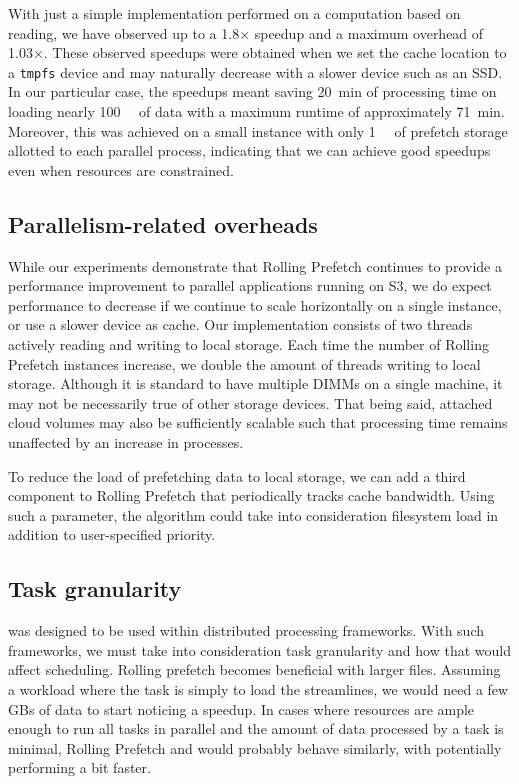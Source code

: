 \documentclass[conference]{IEEEtran}
\begin{document}
With just a simple implementation performed on a computation based on reading, we have observed up to a 1.8$\times$ speedup and a maximum overhead of 1.03$\times$. These observed speedups were
obtained when we set the cache location to a \texttt{tmpfs} device and may naturally decrease with a slower device such as an SSD. In our particular case, the speedups meant saving 20~min of processing time
on loading nearly \SI{100}{\gibi\byte} of data with a maximum runtime of approximately 71~min. Moreover, this
was achieved on a small instance with only \SI{1}{\gibi\byte} of prefetch storage allotted to each parallel
process, indicating that we can achieve good speedups even when resources are constrained. 

\subsection{Parallelism-related overheads}

While our experiments demonstrate that Rolling Prefetch continues to provide a performance improvement to parallel
applications running on S3, we do expect  performance to decrease if we continue to scale horizontally on
a single instance, or use a slower device as cache. Our implementation consists of two threads actively reading and writing to local storage. Each time the number of Rolling
Prefetch instances increase, we double the amount of threads writing to local storage. Although it is standard
to have multiple DIMMs on a single machine, it may
not be necessarily true of other storage devices. That being said, attached cloud volumes may
also be sufficiently scalable such that processing time remains unaffected by an increase in processes.

To reduce the load of prefetching data to local storage, we can add a third component to Rolling Prefetch that periodically tracks cache bandwidth. Using such a parameter, the algorithm could take into consideration filesystem 
load in addition to user-specified priority.


\subsection{Task granularity}
\sfs was designed to be used within distributed processing frameworks. With such frameworks, we must take into consideration task granularity and how that would affect
scheduling. Rolling prefetch becomes beneficial with larger files. Assuming a workload where the task is simply to load the streamlines, we would need a few
GBs of data to start noticing a speedup. In cases where resources are ample enough to run all tasks in
parallel and the amount of data processed by a task is minimal, Rolling Prefetch and \sfs would probably behave
similarly, with \sfs potentially performing a bit faster.
\end{document}
